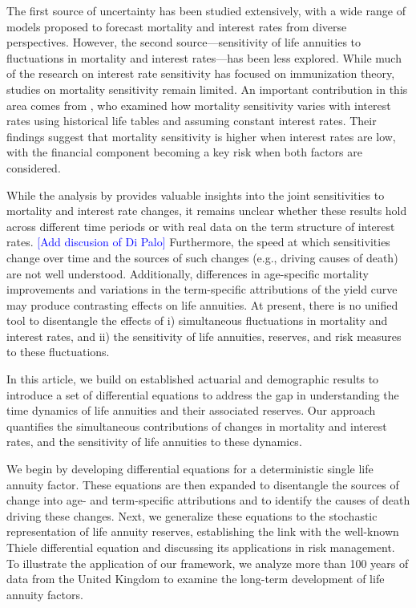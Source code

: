 \documentclass[12pt]{article}
\newcommand{\note}[1]{\textcolor{blue}{[#1]}}
\begin{document}
The first source of uncertainty has been studied extensively, with a wide range of models proposed to forecast mortality and interest rates from diverse perspectives. However, the second source—sensitivity of life annuities to fluctuations in mortality and interest rates—has been less explored. While much of the research on interest rate sensitivity has focused on immunization theory, studies on mortality sensitivity remain limited. An important contribution in this area comes from \citet{rabitti2020mortality}, who examined how mortality sensitivity varies with interest rates using historical life tables and assuming constant interest rates. Their findings suggest that mortality sensitivity is higher when interest rates are low, with the financial component becoming a key risk when both factors are considered.

While the analysis by \citet{rabitti2020mortality} provides valuable insights into the joint sensitivities to mortality and interest rate changes, it remains unclear whether these results hold across different time periods or with real data on the term structure of interest rates. \note{Add discusion of Di Palo} Furthermore, the speed at which sensitivities change over time and the sources of such changes (e.g., driving causes of death) are not well understood. Additionally, differences in age-specific mortality improvements and variations in the term-specific attributions of the yield curve may produce contrasting effects on life annuities. At present, there is no unified tool to disentangle the effects of i) simultaneous fluctuations in mortality and interest rates, and ii) the sensitivity of life annuities, reserves, and risk measures to these fluctuations.

In this article, we build on established actuarial and demographic results to introduce a set of differential equations to address the gap in understanding the time dynamics of life annuities and their associated reserves. Our approach quantifies the simultaneous contributions of changes in mortality and interest rates, and the sensitivity of life annuities to these dynamics.

We begin by developing differential equations for a deterministic single life annuity factor. These equations are then expanded to disentangle the sources of change into age- and term-specific attributions and to identify the causes of death driving these changes. Next, we generalize these equations to the stochastic representation of life annuity reserves, establishing the link with the well-known Thiele differential equation and discussing its applications in risk management. To illustrate the application of our framework, we analyze more than 100 years of data from the United Kingdom to examine the long-term development of life annuity factors.
\end{document}
